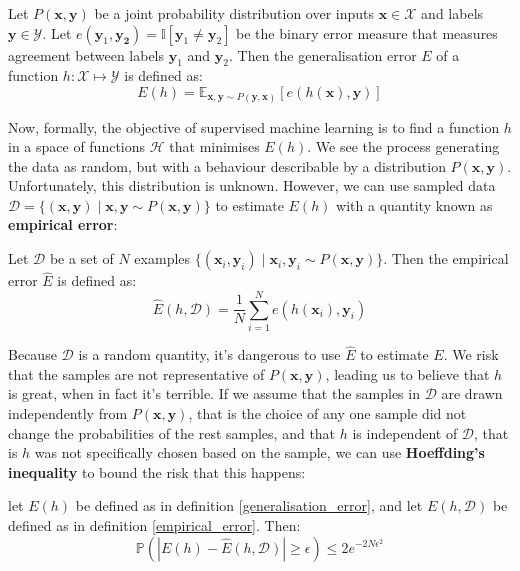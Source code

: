 \begin{definition} \label{generalisation_error}
	Let $P(\mathbf{x}, \mathbf{y})$ be a joint probability distribution over inputs $\mathbf{x} \in \mathcal{X}$ and labels $\mathbf{y} \in \mathcal{Y}$. Let $e(\mathbf{y}_1, \mathbf{y_2}) = \mathbb{I}[\mathbf{y}_1 \neq \mathbf{y}_2]$ be the binary error measure that measures agreement between labels $\mathbf{y}_1$ and $\mathbf{y}_2$. Then the generalisation error $E$ of a function $h: \mathcal{X} \mapsto \mathcal{Y}$ is defined as:
	$$
		E(h) = \mathbb{E}_{\mathbf{x},\mathbf{y}\sim P(\mathbf{y}, \mathbf{x})}[e(h(\mathbf{x}), \mathbf{y})]
	$$
\end{definition}
Now, formally, the objective of supervised machine learning is to find a function $h$ in a space of functions $\mathcal{H}$ that minimises $E(h)$. We see the process generating the data as random, but with a behaviour describable by a distribution $P(\mathbf{x}, \mathbf{y})$. Unfortunately, this distribution is unknown. However, we can use sampled data $\mathcal{D} = \{(\mathbf{x}, \mathbf{y}) \mid \mathbf{x}, \mathbf{y} \sim P(\mathbf{x}, \mathbf{y})\}$ to estimate $E(h)$ with a quantity known as \textbf{empirical error}:

\begin{definition} \label{empirical_error}
	Let $\mathcal{D}$ be a set of $N$ examples $\{(\mathbf{x}_i, \mathbf{y}_i) \mid \mathbf{x}_i, \mathbf{y}_i \sim P(\mathbf{x}, \mathbf{y})\}$. Then the empirical error $\hat{E}$ is defined as:
	$$
		\hat{E}(h, \mathcal{D}) = \frac{1}{N}\sum\limits_{i=1}^N e(h(\mathbf{x}_i), \mathbf{y}_i)
	$$
\end{definition}

Because $\mathcal{D}$ is a random quantity, it's dangerous to use $\hat{E}$ to estimate $E$. We risk that the samples are not representative of $P(\mathbf{x}, \mathbf{y})$, leading us to believe that $h$ is great, when in fact it's terrible. If we assume that the samples in $\mathcal{D}$ are drawn independently from $P(\mathbf{x}, \mathbf{y})$, that is the choice of any one sample did not change the probabilities of the rest samples, and that $h$ is independent of $\mathcal{D}$, that is $h$ was not specifically chosen based on the sample, we can use \textbf{Hoeffding's inequality} to bound the risk that this happens:

\begin{theorem}
	let $E(h)$ be defined as in definition \ref{generalisation_error}, and let $E(h, \mathcal{D})$ be defined as in definition \ref{empirical_error}. Then:
	$$
	\mathbb{P}\left( |E(h) - \hat{E}(h, \mathcal{D})| \geq \epsilon \right) \leq 2e^{-2N\epsilon^2}
	$$
\end{theorem}

